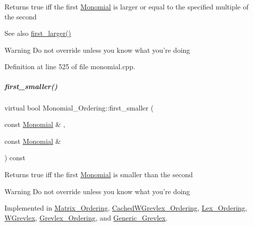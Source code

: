 \begin{DoxyReturn}{Returns}
{\ttfamily true} iff the first \hyperlink{group__polygroup_class_monomial}{Monomial} is larger or equal to the specified multiple of the second 
\end{DoxyReturn}
\begin{DoxySeeAlso}{See also}
\hyperlink{group__orderinggroup_aed41fe82e1ca5cd287a93d287fee7c20}{first\+\_\+larger()} 
\end{DoxySeeAlso}
\begin{DoxyWarning}{Warning}
Do not override unless you know what you're doing 
\end{DoxyWarning}


Definition at line 525 of file monomial.\+cpp.

\mbox{\label{group__orderinggroup_ab6c02638f87382f7a9a95b994e9a5dfb}} 
\subparagraph{\texorpdfstring{first\+\_\+smaller()}{first\_smaller()}}
{\footnotesize\ttfamily virtual bool Monomial\+\_\+\+Ordering\+::first\+\_\+smaller (\begin{DoxyParamCaption}\item[{const \hyperlink{group__polygroup_class_monomial}{Monomial} \&}]{,  }\item[{const \hyperlink{group__polygroup_class_monomial}{Monomial} \&}]{ }\end{DoxyParamCaption}) const\hspace{0.3cm}{\ttfamily [pure virtual]}}

\begin{DoxyReturn}{Returns}
{\ttfamily true} iff the first \hyperlink{group__polygroup_class_monomial}{Monomial} is smaller than the second 
\end{DoxyReturn}
\begin{DoxyWarning}{Warning}
Do not override unless you know what you're doing 
\end{DoxyWarning}


Implemented in \hyperlink{group__orderinggroup_ab7881ff6bbc52d02bf786ef8ab8c5c37}{Matrix\+\_\+\+Ordering}, \hyperlink{group__orderinggroup_a131b09d8226c2dc5f0718f90ab8e009f}{Cached\+W\+Grevlex\+\_\+\+Ordering}, \hyperlink{group__orderinggroup_ae42ea2c7b8fa45bcb46e56480d5f8abb}{Lex\+\_\+\+Ordering}, \hyperlink{group__orderinggroup_a0e4327be4c18de7180ba2cd8c2f9d549}{W\+Grevlex}, \hyperlink{group__orderinggroup_abb1afdfa6ace5b90e425d0645e278c67}{Grevlex\+\_\+\+Ordering}, and \hyperlink{group__orderinggroup_a48ba39468e17d826988b28f5d871d868}{Generic\+\_\+\+Grevlex}.

